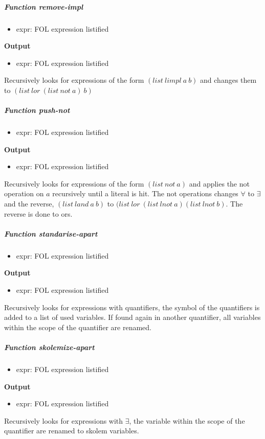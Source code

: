 \documentclass[paper=a4, fontsize=11pt]{scrartcl}
\numberwithin{equation}{section}		%
\numberwithin{figure}{section}			%
\numberwithin{table}{section}				%
\begin{document}
\subparagraph{Function remove-impl}
\begin{itemize}
  \item {expr:} FOL expression listified
\end{itemize}
\noindent\textbf{Output}
\begin{itemize}
    \item{expr:} FOL expression listified
\end{itemize}
Recursively looks for expressions of the form $ (list\ limpl\ a\ b) $ and changes
them to $(list\ lor\ (list\ not\ a)\ b)$


\subparagraph{Function push-not}
\begin{itemize}
  \item {expr:} FOL expression listified
\end{itemize}
\noindent\textbf{Output}
\begin{itemize}
    \item{expr:} FOL expression listified
\end{itemize}
Recursively looks for expressions of the form $ (list\ not\ a) $ and applies the
not operation on $a$ recursively until a literal is hit. The not operations
changes $\forall$ to $\exists$ and the reverse, $(list\ land\ a\ b)$ to $(list\ lor\ (list\
lnot\ a) (list\ lnot\ b)$. The reverse is done to ors.


\subparagraph{Function standarise-apart}
\begin{itemize}
  \item {expr:} FOL expression listified
\end{itemize}
\noindent\textbf{Output}
\begin{itemize}
    \item{expr:} FOL expression listified
\end{itemize}
Recursively looks for expressions with quantifiers, the symbol of the
quantifiers is added to a list of used variables. If found again in another
quantifier, all variables within the scope of the quantifier are renamed.

\subparagraph{Function skolemize-apart}
\begin{itemize}
  \item {expr:} FOL expression listified
\end{itemize}
\noindent\textbf{Output}
\begin{itemize}
    \item{expr:} FOL expression listified
\end{itemize}
Recursively looks for expressions with $\exists$,  the variable  within the
scope of the quantifier are renamed to skolem variables.
\end{document}
